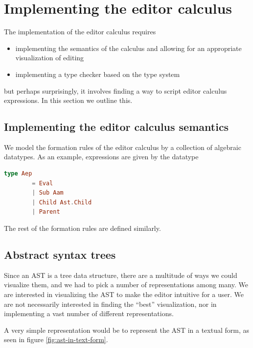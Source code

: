 \section{Implementing the editor calculus}

The implementation of the editor calculus requires

\begin{itemize}
\item implementing the semantics of the calculus and allowing for an
  appropriate visualization of editing
\item implementing a type checker based on the type system
\end{itemize}

but perhaps surprisingly, it involves finding a way to script editor
calculus expressions. In this section we outline this.

\subsection{Implementing the editor calculus semantics}

We model the formation rules of the editor calculus by a collection of
algebraic datatypes. As an example, expressions are given by the
datatype

\begin{lstlisting}[language=elm,%
                   label={aep-without-holes-definition},%
                   gobble=4,%
                   caption={Formation rules (\ref{aep-formation-rules}) modeled in Elm},%
                   ]
    type Aep
        = Eval
        | Sub Aam
        | Child Ast.Child
        | Parent
\end{lstlisting}

The rest of the formation rules are defined similarly.

\subsection{Abstract syntax trees}

Since an AST is a tree data structure, there are a multitude of ways we could
visualize them, and we had to pick a number of representations among many. We
are interested in visualizing the AST to make the editor intuitive for a user.
We are not necessarily interested in finding the ``best'' visualization, nor in
implementing a vast number of different representations.

A very simple representation would be to represent the AST in a textual form,
as seen in figure \ref{fig:ast-in-text-form}.

